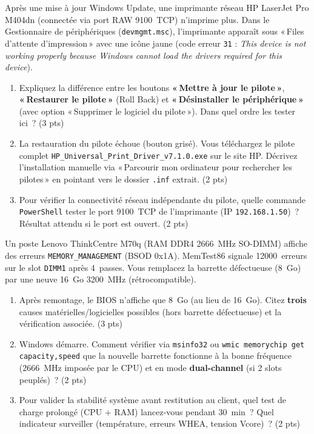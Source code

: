 \documentclass[11pt]{article}
\begin{document}
\begin{exercice}
Après une mise à jour Windows Update, une imprimante réseau HP LaserJet Pro M404dn (connectée via port RAW \SI{9100}{TCP}) n'imprime plus. Dans le Gestionnaire de périphériques (\texttt{devmgmt.msc}), l'imprimante apparaît sous « Files d'attente d'impression » avec une icône jaune (code erreur \texttt{31} : \textit{This device is not working properly because Windows cannot load the drivers required for this device}).
\begin{enumerate}
    \item Expliquez la différence entre les boutons \textbf{« Mettre à jour le pilote »}, \textbf{« Restaurer le pilote »} (Roll Back) et \textbf{« Désinstaller le périphérique »} (avec option « Supprimer le logiciel du pilote »). Dans quel ordre les tester ici~? (3 pts)
    \item La restauration du pilote échoue (bouton grisé). Vous téléchargez le pilote complet \texttt{HP\_Universal\_Print\_Driver\_v7.1.0.exe} sur le site HP. Décrivez l'installation manuelle via « Parcourir mon ordinateur pour rechercher les pilotes » en pointant vers le dossier \texttt{.inf} extrait. (2 pts)
    \item Pour vérifier la connectivité réseau indépendante du pilote, quelle commande \texttt{PowerShell} tester le port \SI{9100}{TCP} de l'imprimante (IP \texttt{192.168.1.50})~? Résultat attendu si le port est ouvert. (2 pts)
\end{enumerate}
\end{exercice}

\begin{exercice}
Un poste Lenovo ThinkCentre M70q (RAM DDR4 \SI{2666}{MHz} SO-DIMM) affiche des erreurs \texttt{MEMORY\_MANAGEMENT} (BSOD 0x1A). MemTest86 signale \SI{12000}{erreurs} sur le slot \texttt{DIMM1} après \SI{4}{passes}. Vous remplacez la barrette défectueuse (\SI{8}{Go}) par une neuve \SI{16}{Go} \SI{3200}{MHz} (rétrocompatible).
\begin{enumerate}
    \item Après remontage, le BIOS n'affiche que \SI{8}{Go} (au lieu de \SI{16}{Go}). Citez \textbf{trois} causes matérielles/logicielles possibles (hors barrette défectueuse) et la vérification associée. (3 pts)
    \item Windows démarre. Comment vérifier via \texttt{msinfo32} ou \texttt{wmic memorychip get capacity,speed} que la nouvelle barrette fonctionne à la bonne fréquence (\SI{2666}{MHz} imposée par le CPU) et en mode \textbf{dual-channel} (si 2 slots peuplés)~? (2 pts)
    \item Pour valider la stabilité système avant restitution au client, quel test de charge prolongé (CPU + RAM) lancez-vous pendant \SI{30}{min}~? Quel indicateur surveiller (température, erreurs WHEA, tension Vcore)~? (2 pts)
\end{enumerate}
\end{exercice}
\end{document}
